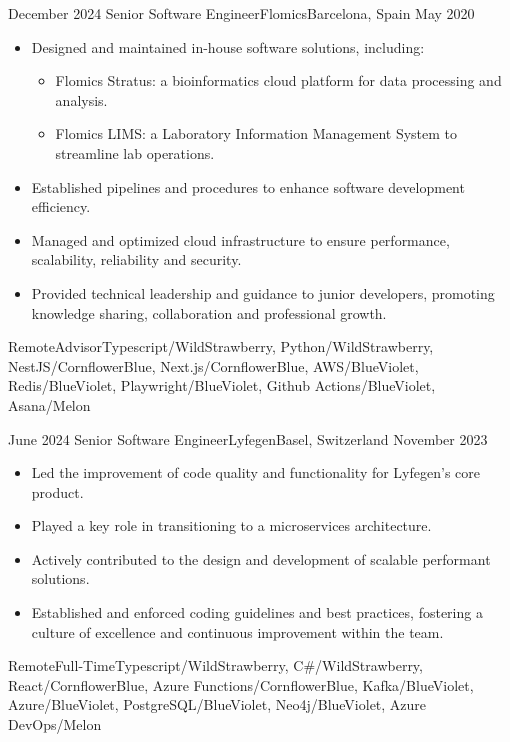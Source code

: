%
%
%
\begin{experiences}

  \experience
  {December 2024} {Senior Software Engineer}{Flomics}{Barcelona, Spain}
  {May 2020}{\begin{itemize}
    \item  Designed and maintained in-house software solutions, including:
    \begin{itemize}
    \item Flomics Stratus: a bioinformatics cloud platform for data processing and analysis.
    \item Flomics LIMS: a Laboratory Information Management System to streamline lab operations.
    \end{itemize}
    \item Established pipelines and procedures to enhance software development efficiency.
    \item Managed and optimized cloud infrastructure to ensure performance, scalability, reliability and security.
    \item Provided technical leadership and guidance to junior developers, promoting knowledge sharing, collaboration and professional growth.
  \end{itemize}}
  {Remote}{Advisor}{Typescript/WildStrawberry, Python/WildStrawberry, NestJS/CornflowerBlue, Next.js/CornflowerBlue, AWS/BlueViolet, Redis/BlueViolet, Playwright/BlueViolet, Github Actions/BlueViolet, Asana/Melon}
  
  \emptySeparator

  \experience
  {June 2024} {Senior Software Engineer}{Lyfegen}{Basel, Switzerland}
  {November 2023}{\begin{itemize}
    \item Led the improvement of code quality and functionality for Lyfegen's core product.
    \item Played a key role in transitioning to a microservices architecture.
    \item Actively contributed to the design and development of scalable performant solutions.
    \item Established and enforced coding guidelines and best practices, fostering a culture of excellence and continuous improvement within the team.
  \end{itemize}}
  {Remote}{Full-Time}{Typescript/WildStrawberry, C\#/WildStrawberry, React/CornflowerBlue, Azure Functions/CornflowerBlue, Kafka/BlueViolet, Azure/BlueViolet, PostgreSQL/BlueViolet, Neo4j/BlueViolet, Azure DevOps/Melon}


\end{experiences}
